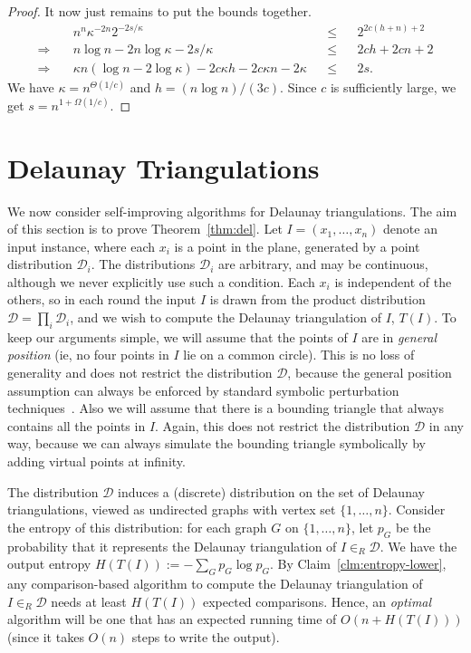 \documentclass{siamltex}
\newcommand{\D}{\mathcal{D}}
\newcommand{\eqdef}{:=}
\begin{document}
\begin{proof}
It now just remains to put the bounds together.
\begin{align*}
& n^n \kappa^{-2n} 2^{-2s/\kappa} &&\leq&& 2^{2c(h+n)+2} \\
\Longrightarrow\quad&  n\log n - 2n\log \kappa - 2s/\kappa &&\leq&& 2ch+2cn+2 \\
\Longrightarrow\quad&  \kappa n(\log n - 2\log \kappa) - 
2c\kappa h - 2c\kappa n - 2\kappa &&\leq&& 2s.
\end{align*}
We have $\kappa = n^{\Theta(1/c)}$ and $h = (n\log n)/(3c)$. 
Since $c$ is sufficiently large,
we get $s = n^{1+\Omega(1/c)}$.
\end{proof}


\section{Delaunay Triangulations}\label{sec:delaunay}

We now consider self-improving algorithms for Delaunay triangulations.
The aim of this section is to prove Theorem~\ref{thm:del}.
Let $I = (x_1,\ldots,x_n)$ denote an input instance, where each
$x_i$ is a point in the plane, generated
by a point distribution $\D_i$. The distributions $\D_i$
are arbitrary, and may be continuous, although we never
explicitly use such a condition.
Each $x_i$ is independent of the others, so in each round
the input $I$ is drawn from the product distribution
$\D = \prod_i \D_i$,  
and we wish to compute the Delaunay
triangulation of $I$, $T(I)$. 
To keep our arguments simple,
we will assume that the points of $I$ are in \emph{general position} 
(ie, no four points in $I$ lie on a common circle).
This is no loss of generality and does not restrict the distribution
$\D$, because the general position assumption can always be enforced
by standard symbolic perturbation techniques~\cite{EdelsbrunnerMu90}.
Also we will assume that there is a bounding triangle that always contains 
all the points in $I$. Again, this does not
restrict the distribution $\D$ in any way, because we can always 
simulate the bounding triangle symbolically by adding virtual points
at infinity.

The distribution $\D$ induces
a (discrete) distribution on the set of Delaunay triangulations,
viewed as undirected graphs with vertex set $\{1,\ldots, n\}$.  
Consider the entropy
of this distribution: for each graph $G$
on $\{1,\ldots, n\}$, let $p_G$ be the probability that it represents
the Delaunay triangulation of $I \in_R \D$. We have 
the output entropy $H(T(I)) \eqdef - \sum_G p_G \log p_G$.
By Claim~\ref{clm:entropy-lower}, 
any comparison-based algorithm 
to compute the Delaunay triangulation of $I \in_R \D$ needs
at least $H(T(I))$ expected comparisons.
Hence, an \emph{optimal} algorithm will be one that has an
expected running time of $O(n + H(T(I)))$ (since it takes
$O(n)$ steps to write the output).
\end{document}
